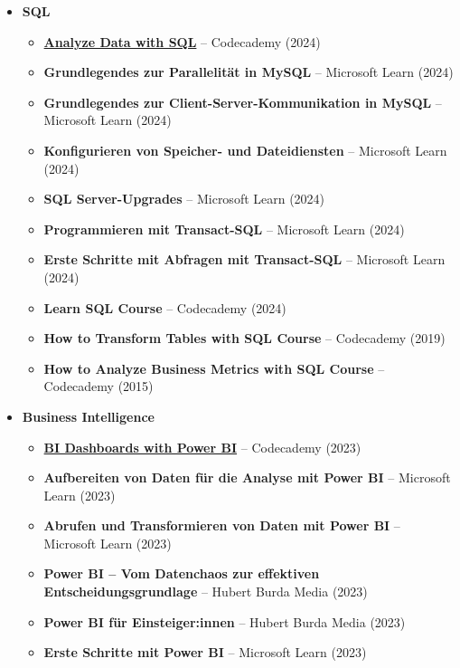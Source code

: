 \documentclass[a4paper,10pt]{article}
\begin{document}
\begin{itemize}
\begin{itemize}
        \item \textbf{SQL}
        \begin{itemize}
            \item \textbf{\href{https://www.codecademy.com/profiles/_cosinus/certificates/5cafb2d937090210d7df3652}{Analyze Data with SQL}} – Codecademy (2024)
            \item \textbf{Grundlegendes zur Parallelität in MySQL} – Microsoft Learn (2024) 
            \item \textbf{Grundlegendes zur Client-Server-Kommunikation in MySQL} – Microsoft Learn (2024)
            \item \textbf{Konfigurieren von Speicher- und Dateidiensten} – Microsoft Learn (2024)
            \item \textbf{SQL Server-Upgrades} – Microsoft Learn (2024)
            \item \textbf{Programmieren mit Transact-SQL} – Microsoft Learn (2024)
            \item \textbf{Erste Schritte mit Abfragen mit Transact-SQL} – Microsoft Learn (2024)
            \item \textbf{Learn SQL Course} – Codecademy (2024)
            \item \textbf{How to Transform Tables with SQL Course} – Codecademy (2019)
            \item \textbf{How to Analyze Business Metrics with SQL Course} – Codecademy (2015)
        \end{itemize}

        \item[\faProjectDiagram] \textbf{Business Intelligence} 
        \begin{itemize} 
        \item \textbf{\href{https://www.codecademy.com/profiles/constantinsinowski/certificates/1cb76ac48943853ca32c394afeb491c9}{BI Dashboards with Power BI}} – Codecademy (2023)
            \item \textbf{Aufbereiten von Daten für die Analyse mit Power BI} – Microsoft Learn (2023)
            \item \textbf{Abrufen und Transformieren von Daten mit Power BI} – Microsoft Learn (2023) 
            \item \textbf{Power BI – Vom Datenchaos zur effektiven Entscheidungsgrundlage} – Hubert Burda Media (2023)
            \item \textbf{Power BI für Einsteiger:innen} – Hubert Burda Media (2023)
            \item \textbf{Erste Schritte mit Power BI} – Microsoft Learn (2023)
        \end{itemize}


\end{itemize}
\end{itemize}
\end{document}
